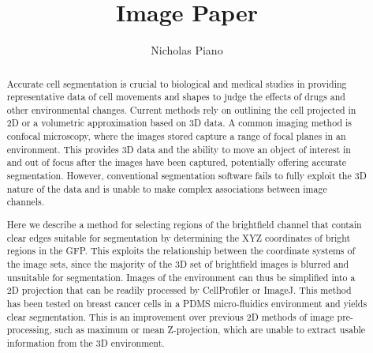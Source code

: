 \documentclass[preprint,11pt,5p,twocolumn]{elsarticle}
\begin{document}
\begin{frontmatter}


\title{Image Paper}




\author{Nicholas Piano}

\address{Cambridge University}

\begin{abstract}

Accurate cell segmentation is crucial to biological and medical studies in providing representative data of cell movements and shapes to judge the effects of drugs and other environmental changes. Current methods rely on outlining the cell projected in 2D or a volumetric approximation based on 3D data. A common imaging method is confocal microscopy, where the images stored capture a range of focal planes in an environment. This provides 3D data and the ability to move an object of interest in and out of focus after the images have been captured, potentially offering accurate segmentation. However, conventional segmentation software fails to fully exploit the 3D nature of the data and is unable to make complex associations between image channels.

Here we describe a method for selecting regions of the brightfield channel that contain clear edges suitable for segmentation by determining the XYZ coordinates of bright regions in the GFP. This exploits the relationship between the coordinate systems of the image sets, since the majority of the 3D set of brightfield images is blurred and unsuitable for segmentation. Images of the environment can thus be simplified into a 2D projection that can be readily processed by CellProfiler or ImageJ. This method has been tested on breast cancer cells in a PDMS micro-fluidics environment and yields clear segmentation. This is an improvement over previous 2D methods of image pre-processing, such as maximum or mean Z-projection, which are unable to extract usable information from the 3D environment.


\end{abstract}
\end{frontmatter}
\end{document}
